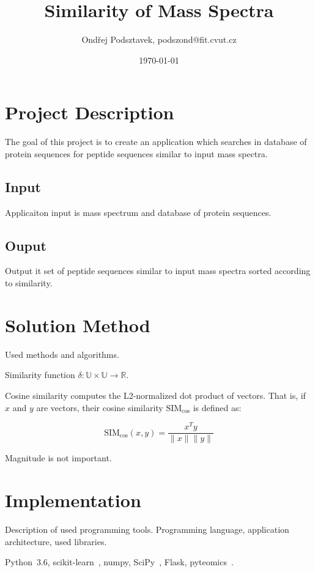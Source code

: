 \documentclass[a4paper,10pt,twocolumn]{article}
\title{Similarity of Mass Spectra}
\date{\today}
\author{Ondřej Podsztavek, podszond@fit.cvut.cz}
\begin{document}
\maketitle

\section{Project Description}

The goal of this project is to create an application which searches
in database of protein sequences for peptide sequences similar to input
mass spectra.

\subsection{Input}

Applicaiton input is mass spectrum and database of protein
sequences.

\subsection{Ouput}

Output it set of peptide sequences similar to input mass
spectra sorted according to similarity.

\section{Solution Method}

Used methods and algorithms.

Similarity function \(\delta: \mathbb{U} \times \mathbb{U} \to \mathbb{R}\).

Cosine similarity computes the L2-normalized dot product of vectors. That is,
if \(x\) and \(y\) are vectors, their cosine similarity \(\text{SIM}_{\cos}\)
is defined as:

\[ \text{SIM}_{\cos}(x, y) = \frac{x^Ty}{\|x\|\|y\|} \]

Magnitude is not important.

\section{Implementation}

Description of used programming tools. Programming language, application
architecture, used libraries.

Python~3.6, scikit-learn~\cite{scikit-learn}, numpy, SciPy~\cite{scipy}, Flask,
pyteomics~\cite{Goloborodko2013}.
\end{document}
